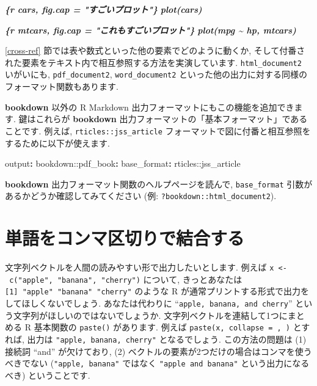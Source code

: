 \documentclass[
  11pt,
]{bxjsreport}
\newenvironment{Shaded}{\begin{snugshade}}{\end{snugshade}}
\newcommand{\AttributeTok}[1]{\textcolor[rgb]{0.77,0.63,0.00}{#1}}
\newcommand{\FunctionTok}[1]{\textcolor[rgb]{0.00,0.00,0.00}{#1}}
\newcommand{\InformationTok}[1]{\textcolor[rgb]{0.56,0.35,0.01}{\textbf{\textit{#1}}}}
\newcommand{\KeywordTok}[1]{\textcolor[rgb]{0.13,0.29,0.53}{\textbf{#1}}}
\begin{document}
\begin{Shaded}
\begin{Highlighting}[]
\InformationTok{\textasciigrave{}\textasciigrave{}\textasciigrave{}\{r cars, fig.cap = "すごいプロット"\}}
\InformationTok{plot(cars)}
\InformationTok{\textasciigrave{}\textasciigrave{}\textasciigrave{}}

\InformationTok{\textasciigrave{}\textasciigrave{}\textasciigrave{}\{r mtcars, fig.cap = "これもすごいプロット"\}}
\InformationTok{plot(mpg \textasciitilde{} hp, mtcars)}
\InformationTok{\textasciigrave{}\textasciigrave{}\textasciigrave{}}
\end{Highlighting}
\end{Shaded}

\ref{cross-ref} 節では表や数式といった他の要素でどのように動くか, そして付番された要素をテキスト内で相互参照する方法を実演しています. \texttt{html\_document2} いがいにも, \texttt{pdf\_document2}, \texttt{word\_document2} といった他の出力に対する同様のフォーマット関数もあります.

\textbf{bookdown} 以外の R Markdown 出力フォーマットにもこの機能を追加できます. 鍵はこれらが \textbf{bookdown} 出力フォーマットの「基本フォーマット」であることです. 例えば, \texttt{rticles::jss\_article} フォーマットで図に付番と相互参照をするために以下が使えます.

\begin{Shaded}
\begin{Highlighting}[]
\FunctionTok{output}\KeywordTok{:}
\AttributeTok{  bookdown::pdf\_book}\KeywordTok{:}\FunctionTok{}
\AttributeTok{    }\FunctionTok{base\_format}\KeywordTok{:}\AttributeTok{ rticles::jss\_article}
\end{Highlighting}
\end{Shaded}

\textbf{bookdown} 出力フォーマット関数のヘルプページを読んで, \texttt{base\_format} 引数があるかどうか確認してみてください (例: \texttt{?bookdown::html\_document2}).

\hypertarget{combine-words}{%
\section{単語をコンマ区切りで結合する}\label{combine-words}}

文字列ベクトルを人間の読みやすい形で出力したいとします. 例えば \texttt{x \textless{}-\ c("apple",\ "banana",\ "cherry")} について, きっとあなたは \texttt{{[}1{]}\ "apple"\ "banana"\ "cherry"} のような R が通常プリントする形式で出力をしてほしくないでしょう. あなたは代わりに ``\texttt{apple, banana, and cherry}'' という文字列がほしいのではないでしょうか. 文字列ベクトルを連結して1つにまとめる R 基本関数の \texttt{paste()} があります. 例えば \texttt{paste(x, collapse = \textquotesingle{},\ \textquotesingle{})} とすれば, 出力は \texttt{"apple, banana, cherry"} となるでしょう. この方法の問題は (1) 接続詞 ``and'' が欠けており, (2) ベクトルの要素が2つだけの場合はコンマを使うべきでない (\texttt{"apple, banana"} ではなく \texttt{"apple and banana"} という出力になるべき) ということです.
\end{document}
